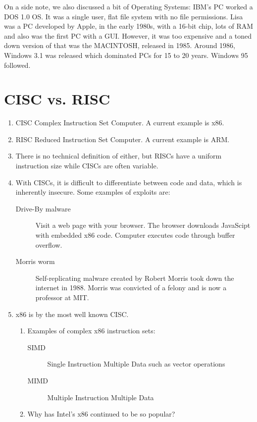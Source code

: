 \documentclass[twoside]{article}
\begin{document}
On a side note, we also discussed a bit of Operating Systems: 
IBM’s PC worked a DOS 1.0 OS. It was a single user, flat file system with no file permissions.  Lisa was a PC developed by Apple, in the early 1980s, with a 16-bit chip, lots of RAM and also was the first PC with a GUI. However, it was too expensive and a toned down version of that was the MACINTOSH, released in 1985. 
Around 1986, Windows 3.1 was released which dominated PCs for 15 to 20 years.  Windows 95 followed. 

\section{CISC vs. RISC}
\begin{enumerate}
	\item CISC Complex Instruction Set Computer. A current example is x86.
	\item RISC Reduced Instruction Set Computer. A current example is ARM.
	\item There is no technical definition of either, but RISCs have a uniform instruction size while
		CISCs are often variable.
	\item With CISCs, it is difficult to differentiate between code and data, which is inherently insecure.
		Some examples of exploits are:
		\begin{description}
			\item[Drive-By malware] Visit a web page with your browser. The browser downloads JavaScipt
				with embedded x86 code. Computer executes code through buffer overflow.
			\item[Morris worm] Self-replicating malware created by Robert Morris took down the internet
				in 1988. Morris was convicted of a felony and is now a professor at MIT.
		\end{description}
	\item x86 is by the most well known CISC.
		\begin{enumerate}
			\item Examples of complex x86 instruction sets:
				\begin{description}
					\item[SIMD] Single Instruction Multiple Data such as vector operations
					\item[MIMD] Multiple Instruction Multiple Data
				\end{description}
			\item Why has Intel's x86 continued to be so popular?
				\begin{enumerate}

\end{enumerate}
\end{enumerate}
\end{enumerate}
\end{document}

